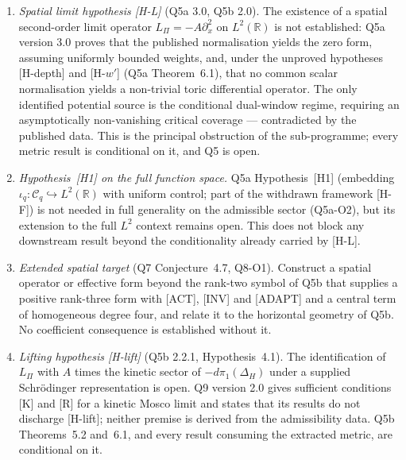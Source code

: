 \documentclass[11pt,a4paper]{article}
\theoremstyle{definition}
\newcommand{\Lpi}{L_\Pi}
\begin{document}
      \begin{enumerate}
        \item \textit{Spatial limit hypothesis [H-L]} (Q5a 3.0, Q5b 2.0).
        The existence of a spatial second-order limit operator $\Lpi = -A\partial_x^2$ on
        $L^2(\mathbb{R})$ is not established: Q5a version 3.0 proves that the published
        normalisation yields the zero form, assuming uniformly bounded weights, and, under the unproved hypotheses [H-depth] and
        [H-$w'$] (Q5a Theorem~6.1), that no common scalar normalisation yields a non-trivial
        toric differential operator.
        The only identified potential source is the conditional dual-window regime, requiring
        an asymptotically non-vanishing critical coverage --- contradicted by the published
        data.
        This is the principal obstruction of the sub-programme; every metric result is
        conditional on it, and Q5 is open.

        \item \textit{Hypothesis~[H1] on the full function space.}
        Q5a Hypothesis~[H1] (embedding $\iota_q: \mathcal{C}_q \hookrightarrow L^2(\mathbb{R})$
        with uniform control; part of the withdrawn framework [H-F]) is not needed in full
        generality on the admissible sector (Q5a-O2), but its extension to the full $L^2$
        context remains open.
        This does not block any downstream result beyond the conditionality already carried
        by [H-L].

        \item \textit{Extended spatial target} (Q7 Conjecture~4.7, Q8-O1).
        Construct a spatial operator or effective form beyond the rank-two symbol of Q5b that
        supplies a positive rank-three form with [ACT], [INV] and [ADAPT] and a central term of
        homogeneous degree four, and relate it to the horizontal geometry of Q5b.
        No coefficient consequence is established without it.

        \item \textit{Lifting hypothesis [H-lift]} (Q5b 2.2.1, Hypothesis~4.1).
        The identification of $\Lpi$ with $A$ times the kinetic sector of $-d\pi_1(\Delta_H)$
        under a supplied Schr\"{o}dinger representation is open.
        Q9 version 2.0 gives sufficient conditions [K] and [R] for a kinetic Mosco limit and
        states that its results do not discharge [H-lift]; neither premise is derived from the
        admissibility data.
        Q5b Theorems~5.2 and~6.1, and every result consuming the extracted metric, are
        conditional on it.


\end{enumerate}
\end{document}
